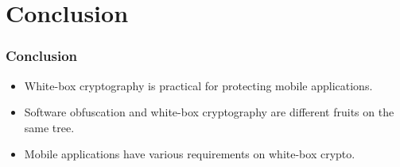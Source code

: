 \documentclass[aspectratio=169,xcolor=dvipsnames]{beamer}
\begin{document}
%
%
%
%
%

\section{Conclusion}

\frame
{
\frametitle{Conclusion}

\begin{itemize}
\setlength{\itemsep}{12pt}
\item White-box cryptography is practical for protecting mobile applications.

\item Software obfuscation and white-box cryptography are different fruits on the same tree.

\item Mobile applications have various requirements on white-box crypto.

\end{itemize}

}
\end{document}
